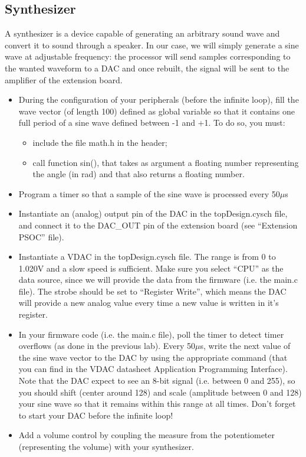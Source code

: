 \documentclass[11pt,a4paper]{article}
\theoremstyle{definition}%
\begin{document}
\subsection{Synthesizer}
A synthesizer is a device capable of generating an arbitrary sound wave and convert it to sound through a speaker.
In our case, we will simply generate a sine wave at adjustable frequency: the processor will send samples corresponding to the wanted waveform to a DAC and once rebuilt, the signal will be sent to the amplifier of the extension board.
\begin{itemize}
	\item During the configuration of your peripherals (before the infinite loop), fill the wave vector (of length 100) defined as global variable so that it contains one full period of a sine wave defined between -1 and +1.
    To do so, you must:
	\begin{itemize}
		\item include the file math.h in the header;
		\item call function sin(), that takes as argument a floating number representing the angle (in rad) and that also returns a floating number.
	\end{itemize}
	\item Program a timer so that a sample of the sine wave is processed every 50$\mu$s
	\item Instantiate an (analog) output pin of the DAC in the topDesign.cysch file, and connect it to the DAC\_OUT pin of the extension board (see ``Extension PSOC'' file). 
	\item Instantiate a VDAC in the topDesign.cysch file. The range is from 0 to 1.020V and a slow speed is sufficient. Make sure you select ``CPU'' as the data source, since we will provide the data from the firmware (i.e. the main.c file). The strobe should be set to ``Register Write'', which means the DAC will provide a new analog value every time a new value is written in it's register. 
	\item In your firmware code (i.e. the main.c file), poll the timer to detect timer overflows (as done in the previous lab). Every 50$\mu$s, write the next value of the sine wave vector to the DAC by using the appropriate command (that you can find in the VDAC datasheet Application Programming Interface). Note that the DAC expect to see an 8-bit signal (i.e. between 0 and 255), so you should shift (center around 128) and scale (amplitude between 0 and 128) your sine wave so that it remains within this range at all times. Don't forget to start your DAC before the infinite loop! 
	\item Add a volume control by coupling the measure from the potentiometer (representing the volume) with your synthesizer.
\end{itemize}
\end{document}
